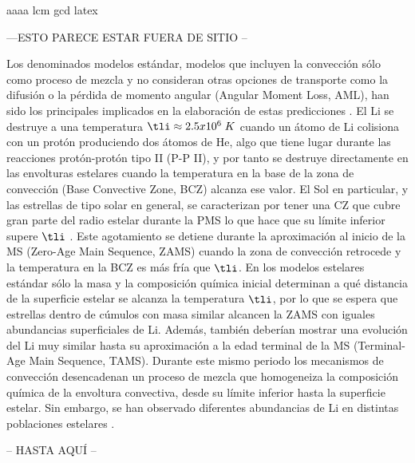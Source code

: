 aaaa \gls{lcm} \acrshort{gcd} \Gls{latex}

---ESTO PARECE ESTAR FUERA DE SITIO --

Los denominados modelos estándar, modelos que incluyen la convección sólo como proceso de mezcla y no consideran otras opciones de transporte como la difusión o la pérdida de momento angular (Angular Moment Loss, AML), han sido los principales implicados en la elaboración de estas predicciones \cite{Sestito2005}. El Li se destruye a una temperatura $\tli \approx 2.5 x 10^6\; K$ cuando un átomo de Li colisiona con un protón produciendo dos átomos de He, algo que tiene lugar durante las reacciones protón-protón tipo II (P-P II), y por tanto se destruye directamente en las envolturas estelares cuando la temperatura en la base de la zona de convección (Base Convective Zone, BCZ) alcanza ese valor. El Sol en particular, y las estrellas de tipo solar en general, se caracterizan por tener una CZ que cubre gran parte del radio estelar durante la PMS lo que hace que su límite inferior supere $\tli$ \cite{Iben1965}. Este agotamiento se detiene durante la aproximación al inicio de la MS (Zero-Age Main Sequence, ZAMS) cuando la zona de convección retrocede y la temperatura en la BCZ es más fría que $\tli$. En los modelos estelares estándar sólo la masa y la composición química inicial determinan a qué distancia de la superficie estelar se alcanza la temperatura $\tli$, por lo que se espera que estrellas dentro de cúmulos con masa similar alcancen la ZAMS con iguales abundancias superficiales de Li. Además, también deberían mostrar una evolución del Li muy similar hasta su aproximación a la edad terminal de la MS (Terminal-Age Main Sequence, TAMS). Durante este mismo periodo los mecanismos de convección desencadenan un proceso de mezcla que homogeneiza la composición química de la envoltura convectiva, desde su límite inferior hasta la superficie estelar. Sin embargo, se han observado diferentes abundancias de Li en distintas poblaciones estelares \cite[][y referencias en las mismas]{Somers2014}.\par

-- HASTA AQUÍ --

